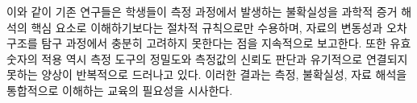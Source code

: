 
이와 같이 기존 연구들은 학생들이 측정 과정에서 발생하는 불확실성을 과학적 증거 해석의
핵심 요소로 이해하기보다는 절차적 규칙으로만 수용하며,
자료의 변동성과 오차 구조를 탐구 과정에서 충분히 고려하지 못한다는 점을 지속적으로 보고한다.
%
또한 유효숫자의 적용 역시 측정 도구의 정밀도와 측정값의 신뢰도 판단과 유기적으로
연결되지 못하는 양상이 반복적으로 드러나고 있다.
이러한 결과는 측정, 불확실성, 자료 해석을 통합적으로 이해하는 교육의 필요성을 시사한다. \\